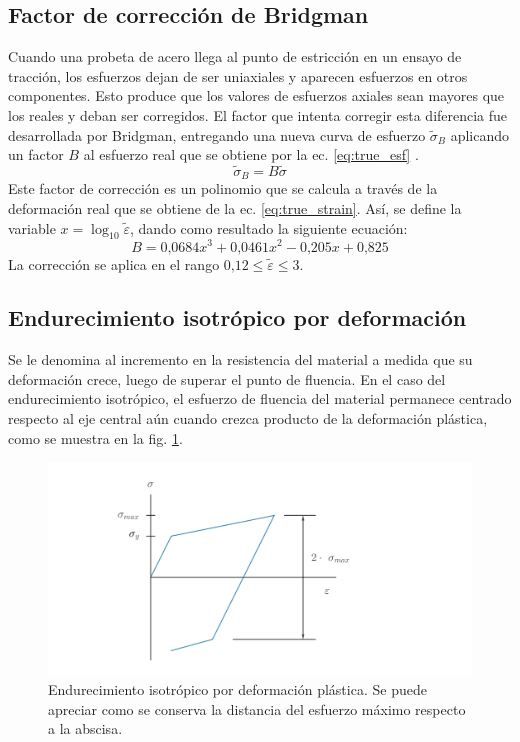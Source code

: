 \subsection{Factor de corrección de Bridgman}
Cuando una probeta de acero llega al punto de estricción en un ensayo de tracción, los esfuerzos dejan de ser uniaxiales y aparecen esfuerzos en otros componentes. Esto produce que los valores de esfuerzos axiales sean mayores que los reales y deban ser corregidos. El factor que intenta corregir esta diferencia fue desarrollada por Bridgman, entregando una nueva curva de esfuerzo $\tilde{\sigma}_B$ aplicando un factor $B$ al esfuerzo real que se obtiene por la ec. \ref{eq:true_esf} \cite{dowling2013mechanical}.
\begin{equation}
	\tilde{\sigma}_B = B\tilde{\sigma}
\end{equation}
Este factor de corrección es un polinomio que se calcula a través de la deformación real que se obtiene de la ec. \ref{eq:true_strain}. Así, se define la variable $x = \log_{10} \tilde{\varepsilon}$, dando como resultado la siguiente ecuación:
\begin{equation}\label{eq:bridgman}
B = 0\text{,}0684x^3 + 0\text{,}0461x^2 - 0\text{,}205x + 0\text{,}825 
\end{equation}
La corrección se aplica en el rango $0\text{,}12 \leq \tilde{\varepsilon} \leq 3$.

\subsection{Endurecimiento isotrópico por deformación}
Se le denomina al incremento en la resistencia del material a medida que su deformación crece, luego de superar el punto de fluencia. En el caso del endurecimiento isotrópico, el esfuerzo de fluencia del material permanece centrado respecto al eje central aún cuando crezca producto de la deformación plástica, como se muestra en la fig. \ref{fig:iso_hard}.

\begin{figure}[h]
\centering
\includegraphics[width=1\linewidth]{Imagenes/iso_hard.pdf}
\caption{Endurecimiento isotrópico por deformación plástica. Se puede apreciar como se conserva la distancia del esfuerzo máximo respecto a la abscisa.}
\label{fig:iso_hard}
\end{figure}


